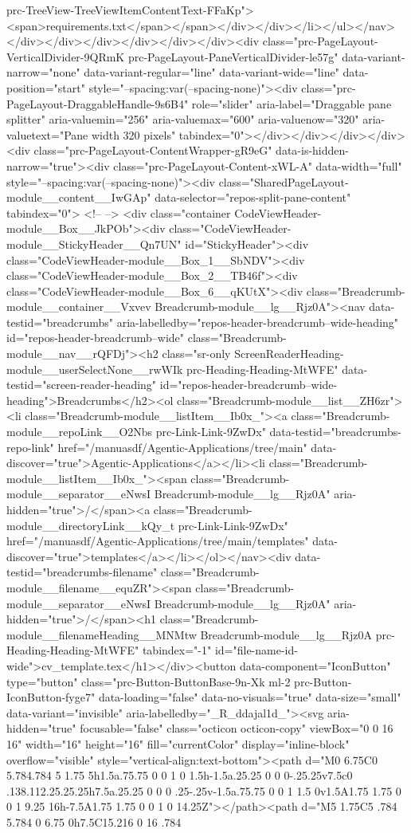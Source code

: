 {{{{{{{prc-TreeView-TreeViewItemContentText-FFaKp"><span>requirements.txt</span></span></div></div></li></ul></nav></div></div></div></div></div></div><div class="prc-PageLayout-VerticalDivider-9QRmK prc-PageLayout-PaneVerticalDivider-le57g" data-variant-narrow="none" data-variant-regular="line" data-variant-wide="line" data-position="start" style="--spacing:var(--spacing-none)"><div class="prc-PageLayout-DraggableHandle-9s6B4" role="slider" aria-label="Draggable pane splitter" aria-valuemin="256" aria-valuemax="600" aria-valuenow="320" aria-valuetext="Pane width 320 pixels" tabindex="0"></div></div></div></div><div class="prc-PageLayout-ContentWrapper-gR9eG" data-is-hidden-narrow="true"><div class="prc-PageLayout-Content-xWL-A" data-width="full" style="--spacing:var(--spacing-none)"><div class="SharedPageLayout-module__content__IwGAp" data-selector="repos-split-pane-content" tabindex="0"> <!-- --> <div class="container CodeViewHeader-module__Box__JkPOb"><div class="CodeViewHeader-module__StickyHeader__Qn7UN" id="StickyHeader"><div class="CodeViewHeader-module__Box_1__SbNDV"><div class="CodeViewHeader-module__Box_2__TB46f"><div class="CodeViewHeader-module__Box_6__qKUtX"><div class="Breadcrumb-module__container__Vxvev Breadcrumb-module__lg__Rjz0A"><nav data-testid="breadcrumbs" aria-labelledby="repos-header-breadcrumb--wide-heading" id="repos-header-breadcrumb--wide" class="Breadcrumb-module__nav__rQFDj"><h2 class="sr-only ScreenReaderHeading-module__userSelectNone__rwWIk prc-Heading-Heading-MtWFE" data-testid="screen-reader-heading" id="repos-header-breadcrumb--wide-heading">Breadcrumbs</h2><ol class="Breadcrumb-module__list__ZH6zr"><li class="Breadcrumb-module__listItem__Ib0x_"><a class="Breadcrumb-module__repoLink__O2Nbs prc-Link-Link-9ZwDx" data-testid="breadcrumbs-repo-link" href="/manuasdf/Agentic-Applications/tree/main" data-discover="true">Agentic-Applications</a></li><li class="Breadcrumb-module__listItem__Ib0x_"><span class="Breadcrumb-module__separator__eNwsI Breadcrumb-module__lg__Rjz0A" aria-hidden="true">/</span><a class="Breadcrumb-module__directoryLink__kQy_t prc-Link-Link-9ZwDx" href="/manuasdf/Agentic-Applications/tree/main/templates" data-discover="true">templates</a></li></ol></nav><div data-testid="breadcrumbs-filename" class="Breadcrumb-module__filename__equZR"><span class="Breadcrumb-module__separator__eNwsI Breadcrumb-module__lg__Rjz0A" aria-hidden="true">/</span><h1 class="Breadcrumb-module__filenameHeading__MNMtw Breadcrumb-module__lg__Rjz0A prc-Heading-Heading-MtWFE" tabindex="-1" id="file-name-id-wide">cv_template.tex</h1></div><button data-component="IconButton" type="button" class="prc-Button-ButtonBase-9n-Xk ml-2 prc-Button-IconButton-fyge7" data-loading="false" data-no-visuals="true" data-size="small" data-variant="invisible" aria-labelledby="_R_ddajal1d_"><svg aria-hidden="true" focusable="false" class="octicon octicon-copy" viewBox="0 0 16 16" width="16" height="16" fill="currentColor" display="inline-block" overflow="visible" style="vertical-align:text-bottom"><path d="M0 6.75C0 5.784.784 5 1.75 5h1.5a.75.75 0 0 1 0 1.5h-1.5a.25.25 0 0 0-.25.25v7.5c0 .138.112.25.25.25h7.5a.25.25 0 0 0 .25-.25v-1.5a.75.75 0 0 1 1.5 0v1.5A1.75 1.75 0 0 1 9.25 16h-7.5A1.75 1.75 0 0 1 0 14.25Z"></path><path d="M5 1.75C5 .784 5.784 0 6.75 0h7.5C15.216 0 16 .784 }}}}}}}
